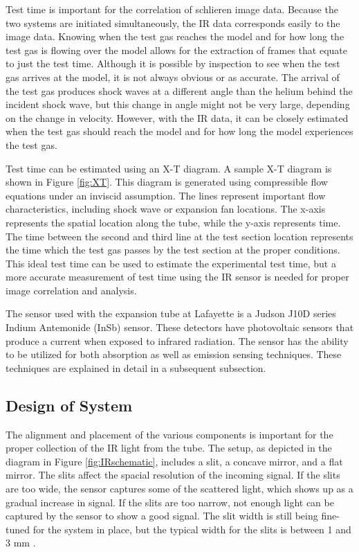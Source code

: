 Test time is important for the correlation of schlieren image data. Because the two systems are initiated simultaneously, the IR data corresponds easily to the image data. Knowing when the test gas reaches the model and for how long the test gas is flowing over the model allows for the extraction of frames that equate to just the test time. Although it is possible by inspection to see when the test gas arrives at the model, it is not always obvious or as accurate. The arrival of the test gas produces shock waves at a different angle than the helium behind the incident shock wave, but this change in angle might not be very large, depending on the change in velocity. However, with the IR data, it can be closely estimated when the test gas should reach the model and for how long the model experiences the test gas. 

Test time can be estimated using an X-T diagram. A sample X-T diagram is shown in Figure \ref{fig:XT}. This diagram is generated using compressible flow equations under an inviscid assumption. The lines represent important flow characteristics, including shock wave or expansion fan locations. The x-axis represents the spatial location along the tube, while the y-axis represents time. The time between the second and third line at the test section location represents the time which the test gas passes by the test section at the proper conditions. This ideal test time can be used to estimate the experimental test time, but a more accurate measurement of test time using the IR sensor is needed for proper image correlation and analysis.

The sensor used with the expansion tube at Lafayette is a Judson J10D series Indium Antemonide (InSb) sensor. These detectors have photovoltaic sensors that produce a current when exposed to infrared radiation. The sensor has the ability to be utilized for both absorption as well as emission sensing techniques. These techniques are explained in detail in a subsequent subsection.


\subsection{Design of System}
The alignment and placement of the various components is important for the proper collection of the IR light from the tube. The setup, as depicted in the diagram in Figure \ref{fig:IRschematic}, includes a slit, a concave mirror, and a flat mirror. The slits affect the spacial resolution of the incoming signal. If the slits are too wide, the sensor captures some of the scattered light, which shows up as a gradual increase in signal. If the slits are too narrow, not enough light can be captured by the sensor to show a good signal. The slit width is still being fine-tuned for the system in place, but the typical width for the slits is between 1 and 3 mm \cite{flower1976experimental}. 


